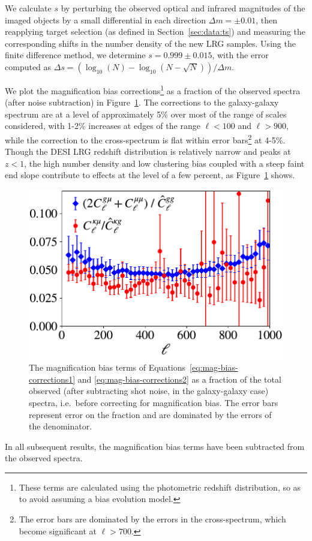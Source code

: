 We calculate $s$ by perturbing the observed optical and infrared magnitudes of the imaged objects by a small differential in each direction $\Delta m = \pm 0.01$, then reapplying target selection (as defined in Section~\ref{sec:data:ts}) and measuring the corresponding shifts in the number density of the new LRG samples. Using the finite difference method, we determine $s = 0.999 \pm 0.015$, with the error computed as $\Delta s = (\log_{10}(N) - \log_{10}(N - \sqrt{N}))/\Delta m$. 

We plot the magnification bias corrections\footnote{These terms are calculated using the photometric redshift distribution, so as to avoid assuming a bias evolution model.} as a fraction of the observed spectra (after noise subtraction) in Figure~\ref{fig:mag_bias_frac}. 
The corrections to the galaxy-galaxy spectrum are at a level of approximately 5\% over most of the range of scales considered, with 1-2\% increases at edges of the range $\ell < 100$ and $\ell > 900$, while the correction to the cross-spectrum is flat within error bars\footnote{The error bars are dominated by the errors in the cross-spectrum, which become significant at $\ell > 700$.} at 4-5\%. Though the DESI LRG redshift distribution is relatively narrow and peaks at $z < 1$, the high number density and low clustering bias coupled with a steep faint end slope contribute to effects at the level of a few percent, as Figure~\ref{fig:mag_bias_frac} shows.

\begin{figure}
\includegraphics[width=\linewidth,trim={0 1cm 0 0}]{figures/mag_bias_frac.pdf}
\caption{The magnification bias terms of Equations~\ref{eq:mag-bias-corrections1} and \ref{eq:mag-bias-corrections2} as a fraction of the total observed (after subtracting shot noise, in the galaxy-galaxy case) spectra, i.e.\ before correcting for magnification bias. The error bars represent error on the fraction and are dominated by the errors of the denominator.}
\label{fig:mag_bias_frac}
\end{figure}

In all subsequent results, the magnification bias terms have been subtracted from the observed spectra.

